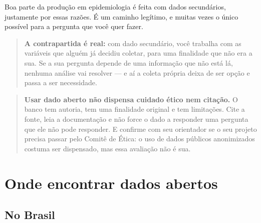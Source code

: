 \documentclass[
]{book}
\begin{document}
Boa parte da produção em epidemiologia é feita com dados secundários, justamente por essas razões. É um caminho legítimo, e muitas vezes o único possível para a pergunta que você quer fazer.

\begin{quote}
\textbf{A contrapartida é real:} com dado secundário, você trabalha com as variáveis que alguém já decidiu coletar, para uma finalidade que não era a sua. Se a sua pergunta depende de uma informação que não está lá, nenhuma análise vai resolver --- e aí a coleta própria deixa de ser opção e passa a ser necessidade.
\end{quote}

\begin{quote}
\textbf{Usar dado aberto não dispensa cuidado ético nem citação.} O banco tem autoria, tem uma finalidade original e tem limitações. Cite a fonte, leia a documentação e não force o dado a responder uma pergunta que ele não pode responder. E confirme com seu orientador se o seu projeto precisa passar pelo Comitê de Ética: o uso de dados públicos anonimizados costuma ser dispensado, mas essa avaliação não é sua.
\end{quote}

\section{Onde encontrar dados abertos}\label{onde-encontrar-dados-abertos}

\subsection{No Brasil}\label{no-brasil}
\end{document}
